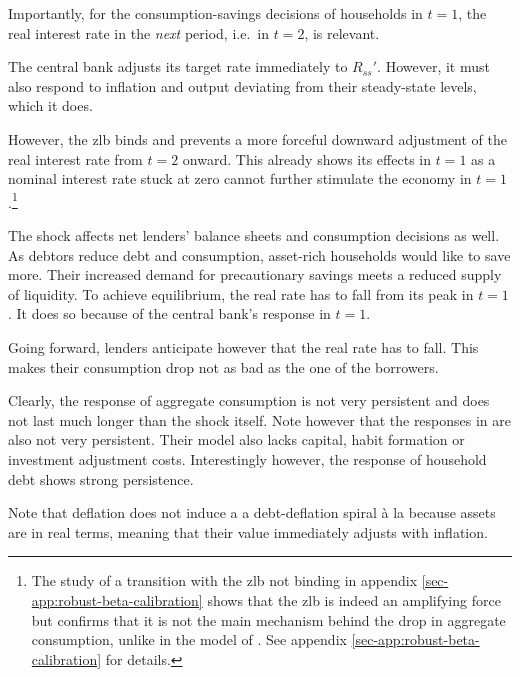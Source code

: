 \documentclass[12pt]{article} %
\numberwithin{equation}{section} %
\numberwithin{figure}{section}
\numberwithin{table}{section}
\begin{document}
Importantly, for the consumption-savings decisions of households in $t=1$, the real interest rate in the \textit{next} period, i.e.~in $t=2$, is relevant. 

The central bank adjusts its target rate immediately to $R_{ss}'$. However, it must also respond to inflation and output deviating from their steady-state levels, which it does.

However, the \Gls{zlb} binds and prevents a more forceful downward adjustment of the real interest rate from $t=2$ onward. This already shows its effects in $t=1$ as a nominal interest rate stuck at zero cannot further stimulate the economy in $t=1$.\footnote{The study of a transition with the \Gls{zlb} not binding in appendix \ref{sec-app:robust-beta-calibration} shows that the \Gls{zlb} is indeed an amplifying force but confirms that it is not the main mechanism behind the drop in aggregate consumption, unlike in the model of \textcite{egg2012}. See appendix \ref{sec-app:robust-beta-calibration} for details.}


The shock affects net lenders' balance sheets and consumption decisions as well. As debtors reduce debt and consumption, asset-rich households would like to save more. Their increased demand for precautionary savings meets a reduced supply of liquidity. To achieve equilibrium, the real rate has to fall from its peak in $t=1$. It does so because of the central bank's response in $t=1$. 

Going forward, lenders anticipate however that the real rate has to fall. This makes their consumption drop not as bad as the one of the borrowers.

Clearly, the response of aggregate consumption is not very persistent and does not last much longer than the shock itself. Note however that the responses in \textcite{gl2017} are also not very persistent. Their model also lacks capital, habit formation or investment adjustment costs. Interestingly however, the response of household debt shows strong persistence. 

Note that deflation does not induce a a debt-deflation spiral à la \textcite{fisher1933} because assets are in real terms, meaning that their value immediately adjusts with inflation.
\end{document}
